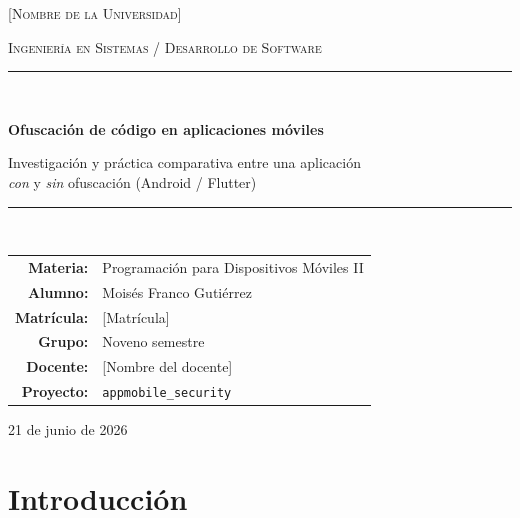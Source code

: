 \documentclass[12pt,letterpaper]{article}
\newcommand{\alumno}{Moisés Franco Gutiérrez}
\newcommand{\matricula}{[Matrícula]}
\newcommand{\materia}{Programación para Dispositivos Móviles II}
\newcommand{\docente}{[Nombre del docente]}
\newcommand{\universidad}{[Nombre de la Universidad]}
\newcommand{\carrera}{Ingeniería en Sistemas / Desarrollo de Software}
\newcommand{\grupo}{Noveno semestre}
\newcommand{\fecha}{21 de junio de 2026}
\begin{document}
\begin{titlepage}
\centering
\vspace*{1cm}

{\scshape\Large \universidad \par}
\vspace{0.3cm}
{\scshape \carrera \par}
\vspace{2.2cm}

\rule{\linewidth}{0.6pt}\\[0.4cm]
{\huge\bfseries Ofuscación de código en aplicaciones móviles\par}
\vspace{0.4cm}
{\Large Investigación y práctica comparativa entre una aplicación\\
\textit{con} y \textit{sin} ofuscación (Android / Flutter)\par}
\rule{\linewidth}{0.6pt}\\[1.5cm]

\begin{flushright}
\large
\begin{tabular}{rl}
\textbf{Materia:} & \materia \\[4pt]
\textbf{Alumno:} & \alumno \\[4pt]
\textbf{Matrícula:} & \matricula \\[4pt]
\textbf{Grupo:} & \grupo \\[4pt]
\textbf{Docente:} & \docente \\[4pt]
\textbf{Proyecto:} & \texttt{appmobile\_security} \\[4pt]
\end{tabular}
\end{flushright}

\vfill
{\large \fecha \par}
\end{titlepage}

\tableofcontents
\newpage

\section{Introducción}
\end{document}
